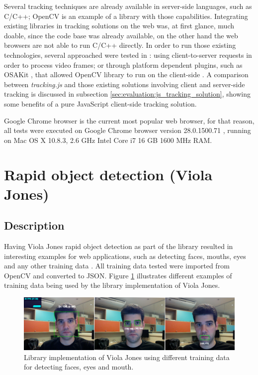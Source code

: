 Several tracking techniques are already available in server-side languages, such as C/C++; OpenCV is an example of a library with those capabilities. Integrating existing libraries in tracking solutions on the web was, at first glance, much doable, since the code base was already available, on the other hand the web browsers are not able to run C/C++ directly. In order to run those existing technologies, several approached were tested in \cite{Pablo2013}: using client-to-server requests in order to process video frames; or through platform dependent plugins, such as OSAKit \cite{OSAKit2013}, that allowed OpenCV library to run on the client-side \cite{Pablo2013}. A comparison between \textit{tracking.js} and those existing solutions involving client and server-side tracking is discussed in subsection \ref{sec:evaluation:js_tracking_solution}, showing some benefits of a pure JavaScript client-side tracking solution.

Google Chrome browser is the current most popular web browser, for that reason, all tests were executed on Google Chrome browser version 28.0.1500.71 \cite{Chrome2010}, running on Mac OS X 10.8.3, 2.6 GHz Intel Core i7 16 GB 1600 MHz RAM.


\section{Rapid object detection (Viola Jones)} %
\label{sec:evaluation:results:rapid_object_detection}

\subsection{Description} %
\label{sub:evaluation:rapid_object_detection:description}

Having Viola Jones rapid object detection as part of the library resulted in interesting examples for web applications, such as detecting faces, mouths, eyes and any other training data \cite{Viola2001}. All training data tested were imported from OpenCV and converted to JSON. Figure \ref{figure:viola_overview} illustrates different examples of training data being used by the library implementation of Viola Jones.

\begin{figure}[!htb]
  \centering
  \includegraphics[width=\linewidth]{chapters/evaluation/viola_overview.png}
  \caption{Library implementation of Viola Jones using different training data for detecting faces, eyes and mouth.}
  \label{figure:viola_overview}
\end{figure}

